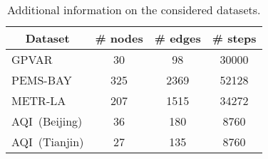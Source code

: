 \begin{table}[ht]
\centering
\begin{tabular}{ l | c c c}
\toprule
\multicolumn{1}{c|}{Dataset} & \# nodes & \# edges & \# steps\\
\midrule
GPVAR & 30 & 98 & 30000\\
PEMS-BAY & 325 & 2369 & 52128\\
METR-LA & 207 & 1515 & 34272\\
AQI~(Beijing) & 36 & 180 & 8760\\
AQI~(Tianjin) & 27 & 135 & 8760\\
\bottomrule
\end{tabular}
\caption{Additional information on the considered datasets.}
\label{t:datasets}
\end{table}